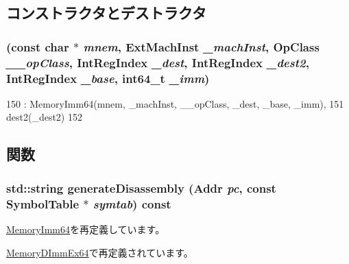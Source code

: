 \subsection{コンストラクタとデストラクタ}
\hypertarget{classArmISA_1_1MemoryDImm64_a6ac32092cd0d3d2068f3f233791b3bca}{
\subsubsection[{MemoryDImm64}]{ (const char $\ast$ {\em mnem}, \/  {\bf ExtMachInst} {\em \_\-machInst}, \/  OpClass {\em \_\-\_\-opClass}, \/  {\bf IntRegIndex} {\em \_\-dest}, \/  {\bf IntRegIndex} {\em \_\-dest2}, \/  {\bf IntRegIndex} {\em \_\-base}, \/  int64\_\-t {\em \_\-imm})}}
\label{classArmISA_1_1MemoryDImm64_a6ac32092cd0d3d2068f3f233791b3bca}



\begin{DoxyCode}
150         : MemoryImm64(mnem, _machInst, __opClass, _dest, _base, _imm),
151           dest2(_dest2)
152     {}
\end{DoxyCode}


\subsection{関数}
\hypertarget{classArmISA_1_1MemoryDImm64_a95d323a22a5f07e14d6b4c9385a91896}{
\subsubsection[{generateDisassembly}]{\setlength{\rightskip}{0pt plus 5cm}std::string generateDisassembly ({\bf Addr} {\em pc}, \/  const SymbolTable $\ast$ {\em symtab}) const}}
\label{classArmISA_1_1MemoryDImm64_a95d323a22a5f07e14d6b4c9385a91896}


\hyperlink{classArmISA_1_1MemoryImm64_a95d323a22a5f07e14d6b4c9385a91896}{MemoryImm64}を再定義しています。

\hyperlink{classArmISA_1_1MemoryDImmEx64_a95d323a22a5f07e14d6b4c9385a91896}{MemoryDImmEx64}で再定義されています。


